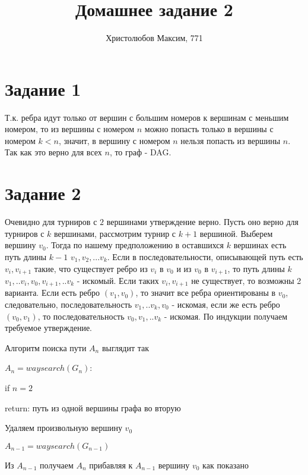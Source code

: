 \documentclass[a4paper,12pt]{article}
\author{Христолюбов Максим, 771}
\title{Домашнее задание 2}
\date{ }
\begin{document}

\maketitle

\section*{Задание 1}
\hspace{0.5cm}
Т.к. ребра идут только от вершин с большим номеров к вершинам с меньшим номером, то из вершины с номером $n$ можно попасть только в вершины с номером $k<n$, значит, в вершину с номером $n$ нельзя попасть из вершины $n$. Так как это верно для всех $n$, то граф - DAG.

\section*{Задание 2}
\hspace{0.5cm}
Очевидно для турниров с $2$ вершинами утверждение верно. Пусть оно верно для турниров с $k$ вершинами, рассмотрим турнир с $k+1$ вершиной. Выберем вершину $v_{0}$. Тогда по нашему предположению в оставшихся $k$ вершинах есть путь длины $k-1$ $v_{1},v_{2},...v_{k}$. Если в последовательности, описывающей путь есть $v_{i},v_{i+1}$ такие, что существует ребро из $v_{i}$ в $v_{0}$ и из $v_{0}$ в $v_{i+1}$, то путь длины $k$ $v_{1},..v_{i},v_{0},v_{i+1},..v_{k}$ - искомый. Если таких $v_{i},v_{i+1}$ не существует, то возможны 2 варианта. Если есть ребро $(v_{1},v_{0})$, то значит все ребра ориентированы в $v_{0}$, следовательно, последовательность $v_{1},..v_{k},v_{0}$ - искомая, если же есть ребро $(v_{0},v_{1})$, то последовательность $v_{0},v_{1},..v_{k}$ - искомая. По индукции получаем требуемое утверждение.

Алгоритм поиска пути $A_{n}$ выглядит так

$A_{n}=waysearch(G_{n})$:

\hspace{0.5cm}	if $n=2$ 
	
	\hspace{1cm}	return: путь из одной вершины графа во вторую
		
\hspace{0.5cm}	Удаляем произвольную вершину $v_{0}$
	
\hspace{0.5cm}	$A_{n-1}=waysearch(G_{n-1})$
	
\hspace{0.5cm}	Из $A_{n-1}$ получаем $A_{n}$ прибавляя к $A_{n-1}$ вершину $v_{0}$ как показано 
\end{document}
